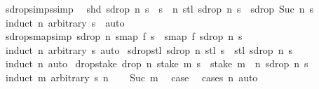\begin{isabellebody}
\isanewline
{}\isamarkupfalse%
\ sdrop{\isacharunderscore}simps{\isacharbrackleft}simp{\isacharbrackright}{\isacharcolon}\isanewline
\ \ {\isachardoublequoteopen}shd\ {\isacharparenleft}sdrop\ n\ s{\isacharparenright}\ {\isacharequal}\ s\ {\isacharbang}{\isacharbang}\ n{\isachardoublequoteclose}\ {\isachardoublequoteopen}stl\ {\isacharparenleft}sdrop\ n\ s{\isacharparenright}\ {\isacharequal}\ sdrop\ {\isacharparenleft}Suc\ n{\isacharparenright}\ s{\isachardoublequoteclose}\isanewline
%
\isadelimproof
\ \ %
\endisadelimproof
%
\isatagproof
{}\isamarkupfalse%
\ {\isacharparenleft}induct\ n\ arbitrary{\isacharcolon}\ s{\isacharparenright}\ \ auto%
\endisatagproof
{\isafoldproof}%
%
\isadelimproof
\isanewline
%
\endisadelimproof
\isanewline
{}\isamarkupfalse%
\ sdrop{\isacharunderscore}smap{\isacharbrackleft}simp{\isacharbrackright}{\isacharcolon}\ {\isachardoublequoteopen}sdrop\ n\ {\isacharparenleft}smap\ f\ s{\isacharparenright}\ {\isacharequal}\ smap\ f\ {\isacharparenleft}sdrop\ n\ s{\isacharparenright}{\isachardoublequoteclose}\isanewline
%
\isadelimproof
\ \ %
\endisadelimproof
%
\isatagproof
{}\isamarkupfalse%
\ {\isacharparenleft}induct\ n\ arbitrary{\isacharcolon}\ s{\isacharparenright}\ auto%
\endisatagproof
{\isafoldproof}%
%
\isadelimproof
\isanewline
%
\endisadelimproof
\isanewline
{}\isamarkupfalse%
\ sdrop{\isacharunderscore}stl{\isacharcolon}\ {\isachardoublequoteopen}sdrop\ n\ {\isacharparenleft}stl\ s{\isacharparenright}\ {\isacharequal}\ stl\ {\isacharparenleft}sdrop\ n\ s{\isacharparenright}{\isachardoublequoteclose}\isanewline
%
\isadelimproof
\ \ %
\endisadelimproof
%
\isatagproof
{}\isamarkupfalse%
\ {\isacharparenleft}induct\ n{\isacharparenright}\ auto%
\endisatagproof
{\isafoldproof}%
%
\isadelimproof
\isanewline
%
\endisadelimproof
\isanewline
{}\isamarkupfalse%
\ drop{\isacharunderscore}stake{\isacharcolon}\ {\isachardoublequoteopen}drop\ n\ {\isacharparenleft}stake\ m\ s{\isacharparenright}\ {\isacharequal}\ stake\ {\isacharparenleft}m\ {\isacharminus}\ n{\isacharparenright}\ {\isacharparenleft}sdrop\ n\ s{\isacharparenright}{\isachardoublequoteclose}\isanewline
%
\isadelimproof
%
\endisadelimproof
%
\isatagproof
{}\isamarkupfalse%
\ {\isacharparenleft}induct\ m\ arbitrary{\isacharcolon}\ s\ n{\isacharparenright}\isanewline
\ \ \isamarkupfalse%
\ {\isacharparenleft}Suc\ m{\isacharparenright}\ \isamarkupfalse%
\ {\isacharquery}case\ \isamarkupfalse%
\ {\isacharparenleft}cases\ n{\isacharparenright}\ auto\isanewline

\end{isabellebody}

